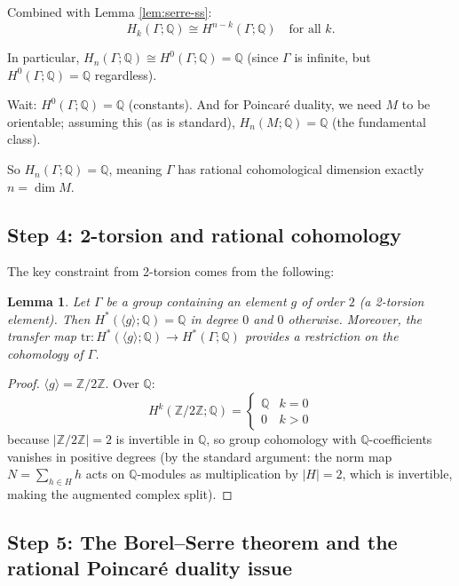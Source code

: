 \documentclass[12pt]{article}
\newtheorem{lemma}[theorem]{Lemma}
\begin{document}
Combined with Lemma \ref{lem:serre-ss}:
\[
H_k(\Gamma; \mathbb{Q}) \cong H^{n-k}(\Gamma; \mathbb{Q}) \quad \text{for all } k.
\]

In particular, $H_n(\Gamma; \mathbb{Q}) \cong H^0(\Gamma; \mathbb{Q}) = \mathbb{Q}$ (since $\Gamma$ is infinite, but $H^0(\Gamma; \mathbb{Q}) = \mathbb{Q}$ regardless).

Wait: $H^0(\Gamma; \mathbb{Q}) = \mathbb{Q}$ (constants). And for Poincar\'{e} duality, we need $M$ to be orientable; assuming this (as is standard), $H_n(M; \mathbb{Q}) = \mathbb{Q}$ (the fundamental class).

So $H_n(\Gamma; \mathbb{Q}) = \mathbb{Q}$, meaning $\Gamma$ has rational cohomological dimension exactly $n = \dim M$.

\subsection{Step 4: 2-torsion and rational cohomology}

The key constraint from 2-torsion comes from the following:

\begin{lemma}\label{lem:torsion}
Let $\Gamma$ be a group containing an element $g$ of order $2$ (a 2-torsion element). Then $H^*(\langle g \rangle; \mathbb{Q}) = \mathbb{Q}$ in degree $0$ and $0$ otherwise. Moreover, the transfer map $\mathrm{tr}: H^*(\langle g \rangle; \mathbb{Q}) \to H^*(\Gamma; \mathbb{Q})$ provides a restriction on the cohomology of $\Gamma$.
\end{lemma}

\begin{proof}
$\langle g \rangle = \mathbb{Z}/2\mathbb{Z}$. Over $\mathbb{Q}$:
\[
H^k(\mathbb{Z}/2\mathbb{Z}; \mathbb{Q}) = \begin{cases} \mathbb{Q} & k = 0 \\ 0 & k > 0 \end{cases}
\]
because $|\mathbb{Z}/2\mathbb{Z}| = 2$ is invertible in $\mathbb{Q}$, so group cohomology with $\mathbb{Q}$-coefficients vanishes in positive degrees (by the standard argument: the norm map $N = \sum_{h \in H} h$ acts on $\mathbb{Q}$-modules as multiplication by $|H| = 2$, which is invertible, making the augmented complex split).
\end{proof}

\subsection{Step 5: The Borel--Serre theorem and the rational Poincar\'{e} duality issue}
\end{document}
